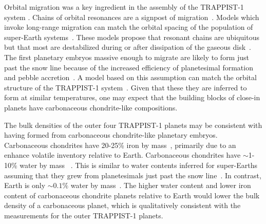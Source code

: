 \documentclass[twocolumn]{aastex63}
\begin{document}
Orbital migration was a key ingredient in the assembly of the TRAPPIST-1 system \citep{Tamayo2017,Ormel2017,Papaloizou2017,MacDonald2018,coleman19}.  Chains of orbital resonances are a signpost of migration~\citep[e.g.]{Cresswell2008}. Models which invoke long-range migration can match the orbital spacing of the population of super-Earth systems~\citep{izidoro17,izidoro19}. These models propose that resonant chains are ubiquitous but that most are destabilized during or after dissipation of the gaseous disk~\citep{terquem07,ogihara09,mcneil10,cossou14}. The first planetary embryos massive enough to migrate are likely to form just past the snow line because of the increased efficiency of planetesimal formation and pebble accretion~\citep{lambrechts14,Ormel2017}. A model based on this assumption can match the orbital structure of the TRAPPIST-1 system~\citep{Schoonenberg2019}. Given that these they are inferred to form at similar temperatures, one may expect that the building blocks of close-in planets have carbonaceous chondrite-like compositions.

The bulk densities of the outer four TRAPPIST-1 planets may be consistent with having formed from carbonaceous chondrite-like planetary embryos. Carbonaceous chondrites have 20-25\% iron by mass~\citep[see values compiled in][]{lodders98}, primarily due to an enhance volatile inventory relative to Earth.  Carbonaceous chondrites have ${\sim}$1-10\% water by mass~
\citep[and are thought to represent the source population of planetesimals that delivered water to Earth; see][for a review]{meech20}. This is similar to water contents inferred for super-Earths assuming that they grew from planetesimals just past the snow line~\citep{Ormel2017,Schoonenberg2019,bitsch19a,Liu2020}. In contrast, Earth is only ${\sim} 0.1\%$ water by mass~\citep[e.g., ][although uncertainties remain in the core's hydrogen content]{hirschmann06,marty12}. The higher water content and lower iron content of carbonaceous chondrite planets relative to Earth would lower the bulk density of a carbonaceous planet, which is qualitatively consistent with the measurements for the outer TRAPPIST-1 planets.

\end{document}
